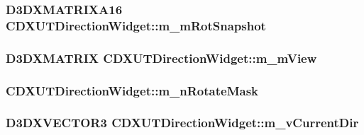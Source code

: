 \label{class_c_d_x_u_t_direction_widget_acd8ea6dfee9ad0593f1dc33a9c6b27ba}
\hypertarget{class_c_d_x_u_t_direction_widget_a7f48a9c9e0aecffeb01cfbbad4e2736c}{
\subsubsection[{m\_\-mRotSnapshot}]{\setlength{\rightskip}{0pt plus 5cm}D3DXMATRIXA16 {\bf CDXUTDirectionWidget::m\_\-mRotSnapshot}}}
\label{class_c_d_x_u_t_direction_widget_a7f48a9c9e0aecffeb01cfbbad4e2736c}
\hypertarget{class_c_d_x_u_t_direction_widget_afb92062e4b1ce5678298d653cbe3775c}{
\subsubsection[{m\_\-mView}]{\setlength{\rightskip}{0pt plus 5cm}D3DXMATRIX {\bf CDXUTDirectionWidget::m\_\-mView}}}
\label{class_c_d_x_u_t_direction_widget_afb92062e4b1ce5678298d653cbe3775c}
\hypertarget{class_c_d_x_u_t_direction_widget_a949513e0f0d9c14a68b734019244bafc}{
\subsubsection[{m\_\-nRotateMask}]{ {\bf CDXUTDirectionWidget::m\_\-nRotateMask}}}
\label{class_c_d_x_u_t_direction_widget_a949513e0f0d9c14a68b734019244bafc}
\hypertarget{class_c_d_x_u_t_direction_widget_a2e519446bb939006632aeeb310ae2405}{
\subsubsection[{m\_\-vCurrentDir}]{\setlength{\rightskip}{0pt plus 5cm}D3DXVECTOR3 {\bf CDXUTDirectionWidget::m\_\-vCurrentDir}}}
